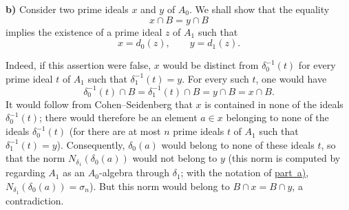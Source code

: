 
\medskip
{}\label{proof:sga3-V-4.1-b}%
\noindent\textbf{b)} Consider two prime ideals \(x\) and \(y\) of
\(A_0\). We shall show that the equality
\[
  x\cap B=y\cap B
\]
implies the existence of a prime ideal \(z\) of \(A_1\) such that
\[
  x=d_0(z),\qquad y=d_1(z).
\]

Indeed, if this assertion were false, \(x\) would be distinct from
\(\delta_0^{-1}(t)\) for every prime ideal \(t\) of \(A_1\) such that
\(\delta_1^{-1}(t)=y\). For every such \(t\), one would have
\[
  \delta_0^{-1}(t)\cap B
  =\delta_1^{-1}(t)\cap B
  =y\cap B=x\cap B.
\]
It would follow from Cohen--Seidenberg that \(x\) is contained in none of
the ideals \(\delta_0^{-1}(t)\); there would therefore be an element
\(a\in x\) belonging to none of the ideals \(\delta_0^{-1}(t)\) (for there
are at most \(n\) prime ideals \(t\) of \(A_1\) such that
\(\delta_1^{-1}(t)=y\)). Consequently, \(\delta_0(a)\) would belong to none
of these ideals \(t\), so that the norm \(N_{\delta_1}(\delta_0(a))\) would
not belong to \(y\) (this norm is computed by regarding \(A_1\) as an
\(A_0\)-algebra through \(\delta_1\); with the notation of
\hyperref[proof:sga3-V-4.1-a]{part~a)}, \(N_{\delta_1}(\delta_0(a))=\sigma_n\)). But this norm would
belong to \(B\cap x=B\cap y\), a contradiction.

